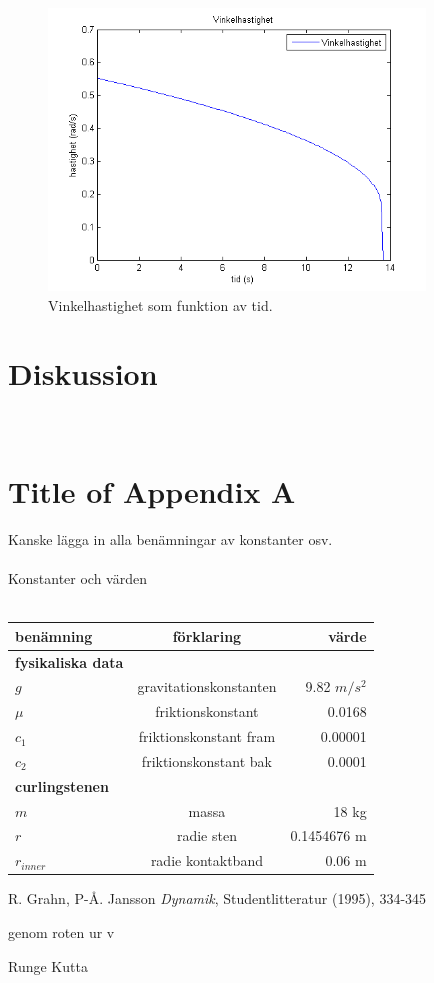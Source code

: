 \documentclass[11pt]{article} %
\begin{document}
\begin{figure}[ht!]
\centering
\includegraphics[width=100mm]{vinkelhastighet_tid_graf.png}
\caption{Vinkelhastighet som funktion av tid.}
\label{fig:vinkelhast_graf}
\label{overflow}
\end{figure}


\section{Diskussion}


\appendix
\section{\\Title of Appendix A} \label{App:AppendixA}
Kanske lägga in alla benämningar av konstanter osv.
\\\\Konstanter och värden\\\\


\begin{tabular}{l | c | r}
benämning & förklaring & värde \\ \hline\hline
\textbf{fysikaliska data} & & \\ \hline
$g$ & gravitationskonstanten & 9.82 $m/s^2$\\
$\mu$ & friktionskonstant & 0.0168\\
$c_1$ & friktionskonstant fram & 0.00001\\
$c_2$ & friktionskonstant bak & 0.0001\\
\textbf{curlingstenen} & & \\ \hline
$m$ & massa & 18 kg\\
$r$ & radie sten & 0.1454676 m\\
$r_{inner}$ & radie kontaktband & 0.06 m\\ \hline
\end{tabular}



\begin{thebibliography}{99}

 R. Grahn, P-Å. Jansson \emph{Dynamik}, Studentlitteratur (1995), 334-345 

\cite{Grahn}

genom roten ur v



Runge Kutta

\end{thebibliography}
\end{document}
